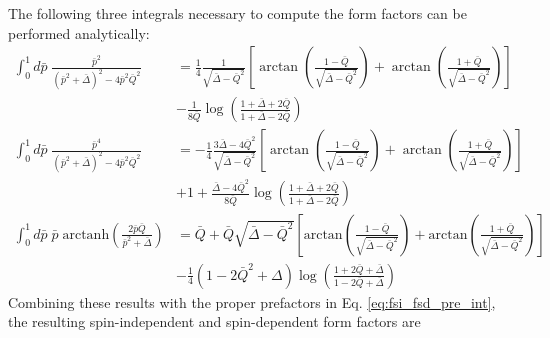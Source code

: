 \documentclass{book}[letterpaper,12pt]
\begin{document}
The following three integrals necessary to compute the form factors can be performed analytically:
\begin{equation}
\begin{split}
\int_0^1 d\bar{p}\;\frac{\bar{p}^2}{(\bar{p}^2+\bar{\Delta})^2-4\bar{p}^2\bar{Q}^2}&=\frac{1}{4}\frac{1}{\sqrt{\bar{\Delta}-\bar{Q}^2}}\left[\arctan\left(\frac{1-\bar{Q}}{\sqrt{\bar{\Delta}-\bar{Q}^2}}\right)+\arctan\left(\frac{1+\bar{Q}}{\sqrt{\bar{\Delta}-\bar{Q}^2}}\right)\right]\\
&-\frac{1}{8\bar{Q}}\log\left(\frac{1+\bar{\Delta}+2\bar{Q}}{1+\bar{\Delta}-2\bar{Q}}\right)\\
\int_0^1 d\bar{p}\;\frac{\bar{p}^4}{(\bar{p}^2+\bar{\Delta})^2-4\bar{p}^2\bar{Q}^2}&=-\frac{1}{4}\frac{3\bar{\Delta}-4\bar{Q}^2}{\sqrt{\bar{\Delta}-\bar{Q}^2}}\left[\arctan\left(\frac{1-\bar{Q}}{\sqrt{\bar{\Delta}-\bar{Q}^2}}\right)+\arctan\left(\frac{1+\bar{Q}}{\sqrt{\bar{\Delta}-\bar{Q}^2}}\right)\right]\\
&+1+\frac{\bar{\Delta}-4\bar{Q}^2}{8\bar{Q}}\log\left(\frac{1+\bar{\Delta}+2\bar{Q}}{1+\bar{\Delta}-2\bar{Q}}\right)\\
\int_0^1d\bar{p}\;\bar{p}\;\mathrm{arctanh}\left(\frac{2\bar{p}\bar{Q}}{\bar{p}^2+\bar{\Delta}}\right)&=\bar{Q}+\bar{Q}\sqrt{\bar{\Delta}-\bar{Q}^2}\left[\mathrm{arctan}\left(\frac{1-\bar{Q}}{\sqrt{\bar{\Delta}-\bar{Q}^2}}\right)+\mathrm{arctan}\left(\frac{1+\bar{Q}}{\sqrt{\bar{\Delta}-\bar{Q}^2}}\right)\right]\\
&-\frac{1}{4}\left(1-2\bar{Q}^2+\Delta\right)\log\left(\frac{1+2\bar{Q}+\bar{\Delta}}{1-2\bar{Q}+\bar{\Delta}}\right)
\end{split}
\end{equation}
Combining these results with the proper prefactors in Eq. \ref{eq:fsi_fsd_pre_int}, the resulting spin-independent and spin-dependent form factors are 
\end{document}
